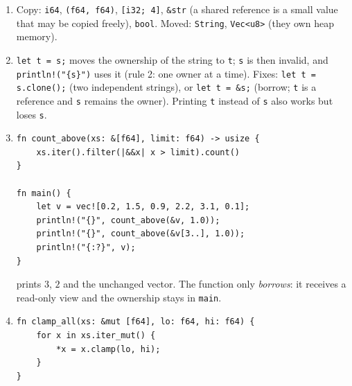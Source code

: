 \begin{enumerate}[label=\textbf{\ansnum.\arabic*}]
  \item Copy: \verb!i64!, \verb!(f64, f64)!, \verb![i32; 4]!, \verb!&str! (a shared reference is a small value that may be copied freely), \verb!bool!. Moved: \verb!String!, \verb!Vec<u8>! (they own heap memory).
  \item \verb!let t = s;! moves the ownership of the string to \verb!t!; \verb!s! is then invalid, and \verb|println!("{s}")| uses it (rule 2: one owner at a time). Fixes: \verb!let t = s.clone();! (two independent strings), or \verb!let t = &s;! (borrow; \verb!t! is a reference and \verb!s! remains the owner). Printing \verb!t! instead of \verb!s! also works but loses \verb!s!.
  \item
\begin{verbatim}
fn count_above(xs: &[f64], limit: f64) -> usize {
    xs.iter().filter(|&&x| x > limit).count()
}

fn main() {
    let v = vec![0.2, 1.5, 0.9, 2.2, 3.1, 0.1];
    println!("{}", count_above(&v, 1.0));
    println!("{}", count_above(&v[3..], 1.0));
    println!("{:?}", v);
}
\end{verbatim}
prints $3$, $2$ and the unchanged vector. The function only \emph{borrows}: it receives a read-only view and the ownership stays in \verb!main!.
  \item
\begin{verbatim}
fn clamp_all(xs: &mut [f64], lo: f64, hi: f64) {
    for x in xs.iter_mut() {
        *x = x.clamp(lo, hi);
    }
}


\end{verbatim}
\end{enumerate}
